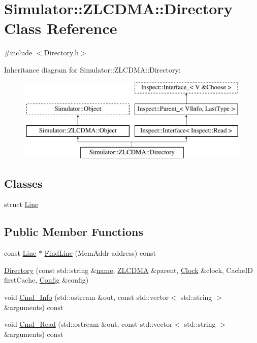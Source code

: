 \hypertarget{class_simulator_1_1_z_l_c_d_m_a_1_1_directory}{\section{Simulator\+:\+:Z\+L\+C\+D\+M\+A\+:\+:Directory Class Reference}
\label{class_simulator_1_1_z_l_c_d_m_a_1_1_directory}
}


{\ttfamily \#include $<$Directory.\+h$>$}

Inheritance diagram for Simulator\+:\+:Z\+L\+C\+D\+M\+A\+:\+:Directory\+:\begin{figure}[H]
\begin{center}
\leavevmode
\includegraphics[height=4.000000cm]{class_simulator_1_1_z_l_c_d_m_a_1_1_directory}
\end{center}
\end{figure}
\subsection*{Classes}
\begin{DoxyCompactItemize}
\item 
struct \hyperlink{struct_simulator_1_1_z_l_c_d_m_a_1_1_directory_1_1_line}{Line}
\end{DoxyCompactItemize}
\subsection*{Public Member Functions}
\begin{DoxyCompactItemize}
\item 
const \hyperlink{struct_simulator_1_1_z_l_c_d_m_a_1_1_directory_1_1_line}{Line} $\ast$ \hyperlink{class_simulator_1_1_z_l_c_d_m_a_1_1_directory_ac00fe51ec5f3990ce980188828759007}{Find\+Line} (Mem\+Addr address) const 
\item 
\hyperlink{class_simulator_1_1_z_l_c_d_m_a_1_1_directory_ac6ebcc9e8624b0f9b1ad39a3da3b540c}{Directory} (const std\+::string \&\hyperlink{mtconf_8c_a8f8f80d37794cde9472343e4487ba3eb}{name}, \hyperlink{class_simulator_1_1_z_l_c_d_m_a}{Z\+L\+C\+D\+M\+A} \&parent, \hyperlink{class_simulator_1_1_clock}{Clock} \&clock, Cache\+I\+D first\+Cache, \hyperlink{class_config}{Config} \&config)
\item 
void \hyperlink{class_simulator_1_1_z_l_c_d_m_a_1_1_directory_a35b65b7ca2100df08244c343672f98ff}{Cmd\+\_\+\+Info} (std\+::ostream \&out, const std\+::vector$<$ std\+::string $>$ \&arguments) const 
\item 
void \hyperlink{class_simulator_1_1_z_l_c_d_m_a_1_1_directory_ab2353a3be32af505f378c2c189407354}{Cmd\+\_\+\+Read} (std\+::ostream \&out, const std\+::vector$<$ std\+::string $>$ \&arguments) const 
\end{DoxyCompactItemize}

